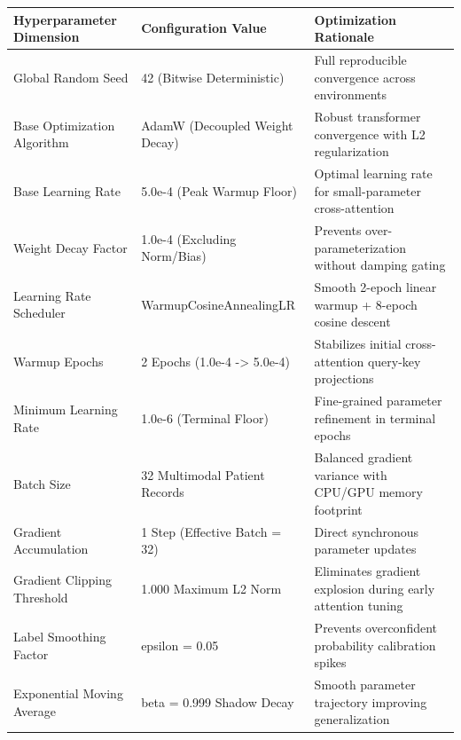 \begin{tabular}{lll}
\toprule
Hyperparameter Dimension & Configuration Value & Optimization Rationale \\
\midrule
Global Random Seed & 42 (Bitwise Deterministic) & Full reproducible convergence across environments \\
Base Optimization Algorithm & AdamW (Decoupled Weight Decay) & Robust transformer convergence with L2 regularization \\
Base Learning Rate & 5.0e-4 (Peak Warmup Floor) & Optimal learning rate for small-parameter cross-attention \\
Weight Decay Factor & 1.0e-4 (Excluding Norm/Bias) & Prevents over-parameterization without damping gating \\
Learning Rate Scheduler & WarmupCosineAnnealingLR & Smooth 2-epoch linear warmup + 8-epoch cosine descent \\
Warmup Epochs & 2 Epochs (1.0e-4 -> 5.0e-4) & Stabilizes initial cross-attention query-key projections \\
Minimum Learning Rate & 1.0e-6 (Terminal Floor) & Fine-grained parameter refinement in terminal epochs \\
Batch Size & 32 Multimodal Patient Records & Balanced gradient variance with CPU/GPU memory footprint \\
Gradient Accumulation & 1 Step (Effective Batch = 32) & Direct synchronous parameter updates \\
Gradient Clipping Threshold & 1.000 Maximum L2 Norm & Eliminates gradient explosion during early attention tuning \\
Label Smoothing Factor & epsilon = 0.05 & Prevents overconfident probability calibration spikes \\
Exponential Moving Average & beta = 0.999 Shadow Decay & Smooth parameter trajectory improving generalization \\
\bottomrule
\end{tabular}
